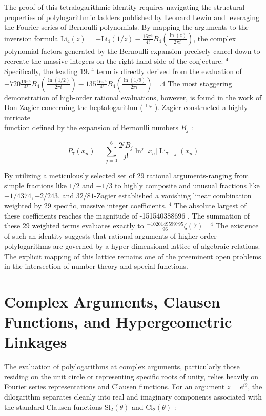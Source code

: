 \documentclass[10pt]{article}
\begin{document}
The proof of this tetralogarithmic identity requires navigating the structural properties of polylogarithmic ladders published by Leonard Lewin and leveraging the Fourier series of Bernoulli polynomials. By mapping the arguments to the inversion formula $\mathrm{Li}_{4}(z)=-\mathrm{Li}_{4}(1 / z)-\frac{16 \pi^{4}}{4!} B_{4}\left(\frac{\ln (z)}{2 \pi i}\right)$, the complex polynomial factors generated by the Bernoulli expansion precisely cancel down to recreate the massive integers on the right-hand side of the conjecture. ${ }^{4}$ Specifically, the leading $19 \pi^{4}$ term is directly derived from the evaluation of $-720 \frac{16 \pi^{4}}{4!} B_{4}\left(\frac{\ln (1 / 2)}{2 \pi i}\right)-135 \frac{16 \pi^{4}}{4!} B_{4}\left(\frac{\ln (1 / 9)}{2 \pi i}\right) \quad .4$ The most staggering demonstration of high-order rational evaluations, however, is found in the work of Don Zagier concerning the heptalogarithm ( ${ }^{\mathrm{Li}_{7}}$ ). Zagier constructed a highly intricate\\
function defined by the expansion of Bernoulli numbers $B_{j}$ :

$$
P_{7}\left(x_{n}\right)=\sum_{j=0}^{6} \frac{2^{j} B_{j}}{j!} \ln ^{j}\left|x_{n}\right| \operatorname{Li}_{7-j}\left(x_{n}\right)
$$

By utilizing a meticulously selected set of 29 rational arguments-ranging from simple fractions like $1 / 2$ and $-1 / 3$ to highly composite and unusual fractions like $-1 / 4374,-2 / 243$, and $32 / 81$-Zagier established a vanishing linear combination weighted by 29 specific, massive integer coefficients. ${ }^{4}$ The absolute largest of these coefficients reaches the magnitude of -151540388696 . The summation of these 29 weighted terms evaluates exactly to $\frac{-1020149599795}{96} \zeta(7) \quad{ }^{4}$ The existence of such an identity suggests that rational arguments of higher-order polylogarithms are governed by a hyper-dimensional lattice of algebraic relations. The explicit mapping of this lattice remains one of the preeminent open problems in the intersection of number theory and special functions.

\section*{Complex Arguments, Clausen Functions, and Hypergeometric Linkages}
The evaluation of polylogarithms at complex arguments, particularly those residing on the unit circle or representing specific roots of unity, relies heavily on Fourier series representations and Clausen functions. For an argument $z=e^{i \theta}$, the dilogarithm separates cleanly into real and imaginary components associated with the standard Clausen functions $\mathrm{Sl}_{2}(\theta)$ and $\mathrm{Cl}_{2}(\theta)$ :
\end{document}
